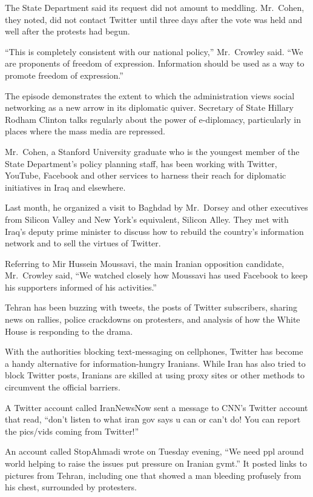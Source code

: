 ﻿\documentclass[12pt,a4paper,onecolumn]{article}
\begin{document}
The State Department said its request did not amount to meddling. Mr.~Cohen, they noted, did not
contact Twitter until three days after the vote was held and well after the protests had begun.

``This is completely consistent with our national policy,'' Mr.~Crowley said. ``We are proponents of
freedom of expression. Information should be used as a way to promote freedom of expression.''

The episode demonstrates the extent to which the administration views social networking as a new
arrow in its diplomatic quiver. Secretary of State Hillary Rodham Clinton talks regularly about the
power of e-diplomacy, particularly in places where the mass media are repressed.

Mr.~Cohen, a Stanford University graduate who is the youngest member of the State Department's
policy planning staff, has been working with Twitter, YouTube, Facebook and other services to
harness their reach for diplomatic initiatives in Iraq and elsewhere.

Last month, he organized a visit to Baghdad by Mr.~Dorsey and other executives from Silicon Valley
and New York's equivalent, Silicon Alley. They met with Iraq's deputy prime minister to discuss how
to rebuild the country's information network and to sell the virtues of Twitter.

Referring to Mir Hussein Moussavi, the main Iranian opposition candidate, Mr.~Crowley said, ``We
watched closely how Moussavi has used Facebook to keep his supporters informed of his activities.''

Tehran has been buzzing with tweets, the posts of Twitter subscribers, sharing news on rallies,
police crackdowns on protesters, and analysis of how the White House is responding to the drama.

With the authorities blocking text-messaging on cellphones, Twitter has become a handy alternative
for information-hungry Iranians. While Iran has also tried to block Twitter posts, Iranians are
skilled at using proxy sites or other methods to circumvent the official barriers.

A Twitter account called IranNewsNow sent a message to CNN's Twitter account that read, ``don't
listen to what iran gov says u can or can't do! You can report the pics/vids coming from Twitter!''

An account called StopAhmadi wrote on Tuesday evening, ``We need ppl around world helping to raise
the issues put pressure on Iranian gvmt.'' It posted links to pictures from Tehran, including one
that showed a man bleeding profusely from his chest, surrounded by protesters.
\end{document}
